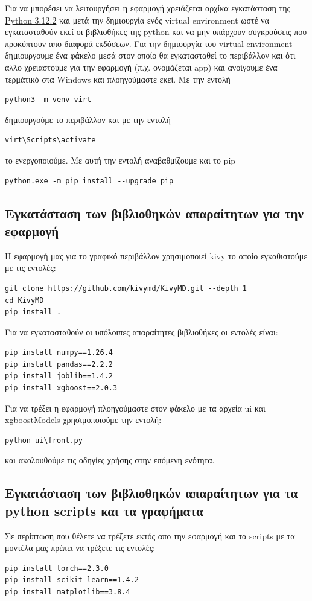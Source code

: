 \documentclass{llncs}
\begin{document}
Για να μπορέσει να λειτουργήσει η εφαρμογή χρειάζεται αρχίκα εγκατάσταση της 
\href{https://www.python.org/downloads/release/python-3123/}{Python 3.12.2} και μετά την
δημιουργία ενός virtual environment ωστέ να εγκατασταθούν εκεί οι βιβλιοθήκες της python
και να μην υπάρχουν συγκρούσεις που προκύπτουν απο διαφορά εκδόσεων.
Για την δημιουργία του virtual environment δημιουργουμε ένα φάκελο μεσά στον 
οποίο θα εγκατασταθεί το περιβάλλον και ότι άλλο χρειαστούμε
για την εφαρμογή (π.χ. ονομάζεται app) και ανοίγουμε ένα τερμάτικό στα Windows 
και πλοηγούμαστε εκεί. Με την εντολή 
\begin{verbatim}
python3 -m venv virt
\end{verbatim} 
δημιουργούμε το περιβάλλον και με την εντολή 
\begin{verbatim}
virt\Scripts\activate
\end{verbatim} το ενεργοποιούμε. Με αυτή την εντολή αναβαθμίζουμε και το pip
\begin{verbatim}
python.exe -m pip install --upgrade pip
\end{verbatim}

\subsection{Εγκατάσταση των βιβλιοθηκών απαραίτητων για την εφαρμογή}
Η εφαρμογή μας για το γραφικό περιβάλλον χρησιμοποιεί kivy το οποίο εγκαθιστούμε με τις 
εντολές:
\begin{verbatim}
git clone https://github.com/kivymd/KivyMD.git --depth 1
cd KivyMD
pip install .
\end{verbatim}
Για να εγκατασταθούν οι υπόλοιπες απαραίτητες βιβλιοθήκες οι εντολές είναι:
\begin{verbatim}
pip install numpy==1.26.4
pip install pandas==2.2.2
pip install joblib==1.4.2
pip install xgboost==2.0.3
\end{verbatim}
Για να τρέξει η εφαρμογή πλοηγούμαστε στον φάκελο 
με τα αρχεία ui και xgboostModels χρησιμοποιούμε την εντολή: 
\begin{verbatim}
python ui\front.py
\end{verbatim}
και ακολουθούμε τις οδηγίες χρήσης στην επόμενη ενότητα.

\subsection{Εγκατάσταση των βιβλιοθηκών απαραίτητων για τα python scripts και τα γραφήματα}
Σε περίπτωση που θέλετε να τρέξετε εκτός απο την εφαρμογή και τα scripts με τα μοντέλα μας
πρέπει να τρέξετε τις εντολές:
\begin{verbatim}
pip install torch==2.3.0
pip install scikit-learn==1.4.2
pip install matplotlib==3.8.4
\end{verbatim}
\end{document}
